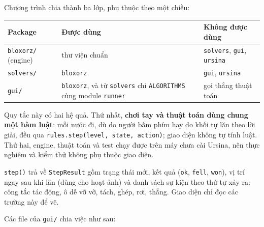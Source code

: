 Chương trình chia thành ba lớp, phụ thuộc theo một chiều:


{\def\LTcaptype{none} %
\begin{longtable}[]{@{}
  >{\raggedright\arraybackslash}p{}
  >{\raggedright\arraybackslash}p{}
  >{\raggedright\arraybackslash}p{}@{}}
\toprule\noalign{}
\rowcolor{tablehead}\begin{minipage}[b]{\linewidth}\raggedright
\textbf{Package}
\end{minipage} & \begin{minipage}[b]{\linewidth}\raggedright
\textbf{Được dùng}
\end{minipage} & \begin{minipage}[b]{\linewidth}\raggedright
\textbf{Không được dùng}
\end{minipage} \\
\midrule\noalign{}
\endhead
\bottomrule\noalign{}
\endlastfoot
\texttt{bloxorz/\allowbreak{}} (engine) & thư viện chuẩn & \texttt{solvers}, \texttt{gui}, \texttt{ursina} \\
\rowrule
\texttt{solvers/\allowbreak{}} & \texttt{bloxorz} & \texttt{gui}, \texttt{ursina} \\
\rowrule
\texttt{gui/\allowbreak{}} & \texttt{bloxorz}, và từ \texttt{solvers} chỉ \texttt{ALGORITHMS} cùng module \texttt{runner} & gọi thẳng thuật toán \\
\end{longtable}
}

Quy tắc này có hai hệ quả. Thứ nhất, \textbf{chơi tay và thuật toán dùng chung một hàm luật}: mỗi nước đi, dù do người bấm phím hay do khối tự lăn theo lời giải, đều qua \texttt{rules.\allowbreak{}step(level, state, action)}; giao diện không tự tính luật. Thứ hai, engine, thuật toán và test chạy được trên máy chưa cài Ursina, nên thực nghiệm và kiểm thử không phụ thuộc giao diện.

\texttt{step()} trả về \texttt{StepResult} gồm trạng thái mới, kết quả (\texttt{ok}, \texttt{fell}, \texttt{won}), vị trí ngay sau khi lăn (dùng cho hoạt ảnh) và danh sách sự kiện theo thứ tự xảy ra: công tắc tác động, ô dễ vỡ vỡ, tách, ghép, rơi, thắng. Giao diện chỉ đọc các trường này để vẽ.

Các file của \texttt{gui/\allowbreak{}} chia việc như sau:


